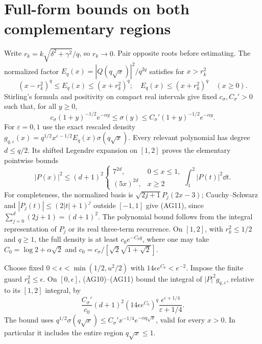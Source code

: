 \section{Full-form bounds on both complementary regions}
Write $r_k=k\sqrt{\delta^2+\gamma^2}/q$, so $r_k\to0$.
Pair opposite roots before estimating. The normalized factor
$E_q(x)=|Q(q\sqrt x)|^2/q^{2q}$ satisfies for $x>r_k^2$
\begin{equation}\tag{AG10}
 (x-r_k^2)^q\le E_q(x)\le(x+r_k^2)^q;
 \quad E_q(x)\le(x+r_k^2)^q\quad(x\ge0).
\end{equation}
Stirling's formula and positivity on compact real intervals give fixed
$c_\sigma,C_\sigma'>0$ such that, for all $y\ge0$,
\[
 c_\sigma(1+y)^{-1/2}e^{-\alpha y}
 \le\sigma(y)\le C_\sigma'(1+y)^{-1/2}e^{-\alpha y}.
\]
For $\varepsilon=0,1$ use the exact rescaled density
$g_{q,\varepsilon}(x)=q^{1/2}x^{\varepsilon-1/2}E_q(x)\sigma(q\sqrt x)$.
Every relevant polynomial has degree $d\le q/2$. Its shifted Legendre
expansion on $[1,2]$ proves the elementary pointwise bounds
\begin{equation}\tag{AG11}
 |P(x)|^2\le(d+1)^2
 \begin{cases}7^{2d},&0\le x\le1,\\(5x)^{2d},&x\ge2\end{cases}
 \int_1^2|P(t)|^2\dd t.
\end{equation}
For completeness, the normalized basis is
$\sqrt{2j+1}P_j(2x-3)$; Cauchy--Schwarz and
$|P_j(t)|\le(2|t|+1)^j$ outside $[-1,1]$ give (AG11), since
$\sum_{j=0}^d(2j+1)=(d+1)^2$. The polynomial bound follows from the
integral representation of $P_j$ or its real three-term recurrence.
On $[1,2]$, with $r_k^2\le1/2$ and $q\ge1$, the full density is at least
$c_0e^{-C_0q}$, where one may take
$C_0=\log2+\alpha\sqrt2$ and
$c_0=c_\sigma/[\sqrt2\sqrt{1+\sqrt2}]$.

Choose fixed $0<\epsilon<\min(1/2,u^2/2)$ with
$14\epsilon e^{C_0}<e^{-2}$. Impose the finite guard $r_k^2\le\epsilon$.
On $[0,\epsilon]$, (AG10)--(AG11) bound the integral of
$|P|^2g_{q,\varepsilon}$, relative to its $[1,2]$ integral, by
\begin{equation}\tag{AG12}
 \frac{C_\sigma'}{c_0}(d+1)^2
 (14\epsilon e^{C_0})^q
 \frac{\epsilon^{\varepsilon+1/4}}{\varepsilon+1/4}.
\end{equation}
The bound uses $q^{1/2}\sigma(q\sqrt x)\le
C_\sigma'x^{-1/4}e^{-\alpha q\sqrt x}$, valid for every $x>0$.
In particular it includes the entire region $q\sqrt x\le1$.

